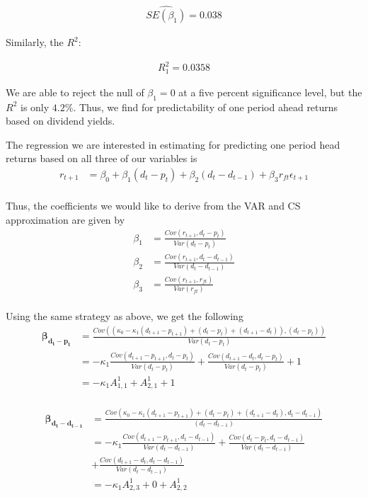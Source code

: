 \documentclass[11pt,letter]{article}
\begin{document}
\begin{align*}
\hat{SE(\beta_1)}=0.038
\end{align*}

Similarly, the $R^2$:

\begin{align*}
R^2_1=0.0358
\end{align*}

We are able to reject the null of $\beta_1=0$ at a five percent significance level, but the $R^2$ is only $4.2\%$. Thus, we find for predictability of one period ahead returns based on dividend yields.  

The regression we are interested in estimating for predicting one period head returns based on all three of our variables is
\begin{align*}
r_{t+1} &= \beta_0 +  \beta_1 (d_t-p_t) + \beta_2 (d_t-d_{t-1}) + \beta_3 r_{ft} \epsilon_{t+1}\\
\end{align*}

Thus, the coefficients we would like to derive from the VAR and CS approximation are given by
\begin{align*}
\beta_1 &= \frac{Cov(r_{t+1},d_t-p_t)}{Var(d_t-p_t)}\\
\beta_2 &= \frac{Cov(r_{t+1},d_t-d_{t-1})}{Var(d_t-d_{t-1})}\\
\beta_3 &= \frac{Cov(r_{t+1},r_{ft})}{Var(r_{ft})}\\
\end{align*}

Using the same strategy as above, we get the following
\begin{align*}
\boldsymbol{\beta_{d_t-p_t}} &= \frac{Cov((\kappa_0 - \kappa_1 (d_{t+1}-p_{t+1})+ (d_t-p_t) + (d_{t+1}-d_t)),(d_t-p_t))}{Var(d_t-p_t)}\\
&= -\kappa_1 \frac{Cov(d_{t+1}-p_{t+1},d_t-p_t)}{Var(d_t-p_t)} +\frac{Cov(d_{t+1}-d_{t},d_t-p_t)}{Var(d_t-p_t)}+1\\
&= -\kappa_1 A^1_{1,1} + A^1_{2,1} + 1\\
\end{align*}

\begin{align*}
\boldsymbol{\beta_{d_t - d_{t-1}}} &= \frac{Cov(\kappa_0 - \kappa_1 (d_{t+1}-p_{t+1})+ (d_t-p_t) + (d_{t+1}-d_t),d_{t}-d_{t-1})}{(d_{t}-d_{t-1})}\\
&= -\kappa_1 \frac{Cov(d_{t+1}-p_{t+1},d_{t}-d_{t-1})}{Var(d_{t}-d_{t-1})} +\frac{Cov(d_{t}-p_{t},d_{t}-d_{t-1})}{Var(d_{t}-d_{t-1})}\\ &+\frac{Cov(d_{t+1}-d_{t},d_{t}-d_{t-1})}{Var(d_{t}-d_{t-1})}\\
&= -\kappa_1 A^1_{2,3} + 0 + A^1_{2,2}\\
\end{align*}
\end{document}
